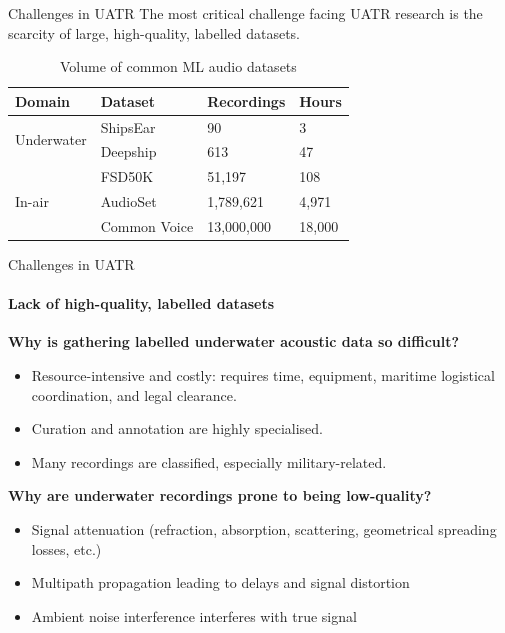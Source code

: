 \documentclass[]{beamer}
\begin{document}
\begin{frame}{Challenges in UATR}
    The most critical challenge facing UATR research is the scarcity of large, high-quality, labelled datasets. 

    \vspace{0.5cm}
    
    \begin{table}[]
        \scriptsize
        \captionsetup{font=scriptsize}
        \setlength{\belowcaptionskip}{0pt}
        \caption{Volume of common ML audio datasets}    
        \begin{tabular}{@{}llll@{}}
        \toprule
        \textbf{Domain} & \textbf{Dataset} & \textbf{Recordings} & \textbf{Hours} \\ \midrule
        \multirow{2}{*}{Underwater} & ShipsEar & 90 & 3 \\
         & Deepship & 613 & 47 \\ \midrule
        \multirow{3}{*}{In-air} & FSD50K & 51,197 & 108 \\
         & AudioSet & 1,789,621 & 4,971 \\
         & Common Voice & 13,000,000 & 18,000 \\ \bottomrule
        \end{tabular}
    \end{table}
\end{frame}

\begin{frame}{Challenges in UATR}
   \framesubtitle{Lack of high-quality, labelled datasets}

   \textbf{Why is gathering labelled underwater acoustic data so difficult?}
   \begin{itemize}
        \item Resource-intensive and costly: requires time, equipment, maritime logistical coordination, and legal clearance.
        \item Curation and annotation are highly specialised.
        \item Many recordings are classified, especially military-related.
   \end{itemize}

   \vspace{0.3cm}
   \textbf{Why are underwater recordings prone to being low-quality?}
    \begin{itemize}
        \item Signal attenuation (refraction, absorption, scattering, geometrical spreading losses, etc.)
        \item Multipath propagation leading to delays and signal distortion
        \item Ambient noise interference interferes with true signal
    \end{itemize}
\end{frame}
\end{document}
